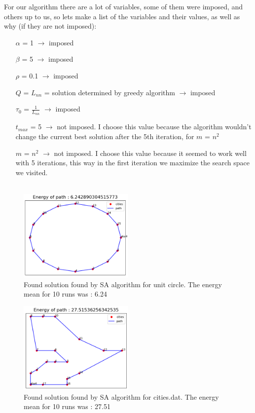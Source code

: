 \documentclass[a4paper]{article}
\begin{document}
For our algorithm there are a lot of variables, some of them were imposed, and others up to us, so lets make a list of the variables and their values, as well as why (if they are not imposed):
\begin{itemize}
\item[$\alpha$] = 1 $\longrightarrow$ imposed
\item[$\beta$] = 5 $\longrightarrow$ imposed
\item[$\rho$] = 0.1 $\longrightarrow$ imposed
\item[$Q$] = $L_{nn}$ = solution determined by greedy algorithm $\longrightarrow$ imposed
\item[$\tau_0$] = $\frac{1}{L_{nn}}$ $\longrightarrow$ imposed
\item[$t_{max}$] = 5 $\longrightarrow$ not imposed. I choose this value because the algorithm wouldn't change the current best solution after the 5th iteration, for $m$ = $n^2$ 
\item[$m$] = $n^2$ $\longrightarrow$ not imposed. I choose this value because it seemed to work well with 5 iterations, this way in the first iteration we maximize the search space we visited.\\\\
\end{itemize}

\begin{figure}[H]
\center
\includegraphics[width=0.5\textwidth]{images/algorithm_as_circle.PNG}
\caption{Found solution found by SA algorithm for unit circle. The energy mean for 10 runs was : 6.24}
\end{figure}

\begin{figure}[H]
\center
\includegraphics[width=0.5\textwidth]{images/algorithm_as_cities.PNG}
\caption{Found solution found by SA algorithm for cities.dat. The energy mean for 10 runs was : 27.51}
\end{figure}
\end{document}
